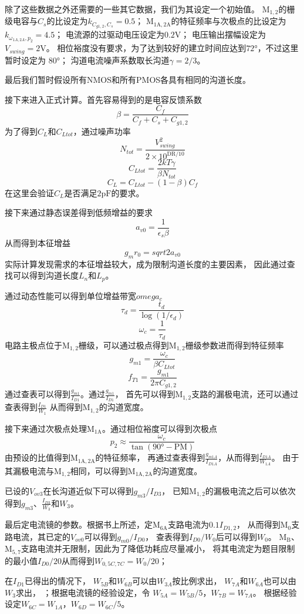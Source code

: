 \documentclass[a4paper]{article}
\newcommand{\uV}{\si{\volt}}
\newcommand{\upF}{\si{\pico\farad}}
\newcommand{\udeg}{\si{\degree}}
\newcommand{\dM}[1]{\mathrm{M}_\mathrm{#1}}
\newcommand{\DM}[1]{$\dM{#1}$}
\begin{document}
除了这些数据之外还需要的一些其它数据，我们为其设定一个初始值。
\DM{1,2}的栅级电容与$C_s$的比设定为$k_{C_{g1,2},C_s}=0.5$；
\DM{1A,2A}的特征频率与次极点的比设定为$k_{\omega_{1A,2A},p_2}=4.5$；
电流源的过驱动电压设定为$0.2\uV$；
电压输出摆幅设定为$V_{swing}=2\uV$。
相位裕度没有要求，为了达到较好的建立时间应达到$72\udeg$，不过这里暂时设定为
$80\udeg$；
沟道电流噪声系数取长沟道$\gamma=2/3$。

最后我们暂时假设所有NMOS和所有PMOS各具有相同的沟道长度。

接下来进入正式计算。首先容易得到的是电容反馈系数
$$\beta=\frac{C_f}{C_f+C_s+C_{g1,2}}$$
为了得到$C_L$和$C_{Ltot}$，通过噪声功率
$$N_{tot}=\frac{V_{swing}^2}{2\times10^{\mathrm{DR}/10}}$$
$$C_{Ltot}=\frac{2kT\gamma}{\beta N_{tot}}$$
$$C_L=C_{Ltot}-(1-\beta)C_f$$
在这里会验证$C_L$是否满足$2\upF$的要求。

接下来通过静态误差得到低频增益的要求
$$a_{v0}=\frac{1}{\epsilon_s\beta}$$
从而得到本征增益
$$g_mr_0=sqrt{2a_{v0}}$$
实际计算发现需求的本征增益较大，成为限制沟道长度的主要因素，
因此通过查找可以得到沟道长度$L_n$和$L_p$。

通过动态性能可以得到单位增益带宽$omega_c$
$$\tau_d=\frac{t_d}{\log(1/\epsilon_d)}$$
$$\omega_c=\frac{1}{\tau_d}$$
电路主极点位于\DM{1,2}栅级，可以通过极点得到\DM{1,2}栅级参数进而得到特征频率
$$g_{m1}=\frac{\omega_c}{\beta C_{Ltot}}$$
$$f_{T1}=\frac{g_{m1}}{2\pi C_{g1,2}}$$
通过查表可以得到$\frac{g_{m1}}{I_{D1}}$。通过$\frac{g_{m1}}{I_{D1}}$，
首先可以得到\DM{1,2}支路的漏极电流，还可以通过查表得到$\frac{I_{D1}}{W_1}$
从而得到\DM{1,2}的沟道宽度。

接下来通过次极点处理\DM{1A}。通过相位裕度可以得到次极点
$$p_2\approx\frac{\omega_c}{\tan(90\udeg-\mathrm{PM})}$$
由预设的比值得到\DM{1A,2A}的特征频率，
再通过查表得到$\frac{g_{m1A}}{I_{D1A}}$，从而得到$\frac{I_{D1A}}{W_{1A}}$。
由于其漏极电流与\DM{1,2}相同，可以得到\DM{1A,2A}的沟道宽度。

已设的$V_{ov3}$在长沟道近似下可以得到$g_{m3}/I_{D3}$，
已知\DM{1,2}的漏极电流之后可以依次得到$g_{m3}$、$\frac{I_{D3}}{W_3}$和$W_3$。

最后定电流镜的参数。根据书上所述，定\DM{6A}支路电流为$0.1I_{D1,2}$，
从而得到\DM{0}支路电流，其已定的$V_{ov0}$可以得到$g_{m0}/I_{D0}$，
查表得到$I_{D0}/W_0$后可以得到$W_0$。
\DM{B}、\DM{5,7}支路电流并无限制，因此为了降低功耗应尽量减小，
将其电流定为题目限制的最小值$I_{D0}/20$从而得到$W_{0,5C,7C}=W_0/20$；

在$I_{D1}$已得出的情况下，
$W_{5B}$和$W_{6B}$可以由$W_{3A}$按比例求出，
$W_{7A}$和$W_{6A}$也可以由$W_3$求出，
；根据电流镜的经验设定，令
$W_{5A}=W_{5B}/5$，$W_{7B}=W_{7A}$。
根据经验设定$W_{6C}=W_{1A}$，$W_{6D}=W_{6C}/5$。
\end{document}

